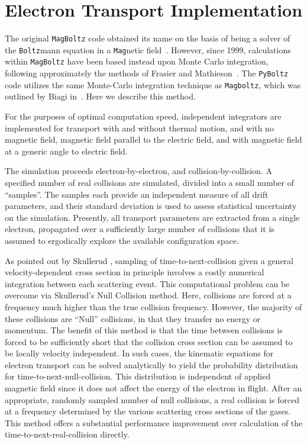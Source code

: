 \documentclass[3p,11pt]{elsarticle}
\begin{document}
\section{Electron Transport Implementation}
\label{Theory}
The original {\tt MagBoltz} code obtained its name on the basis of being a solver of the {\tt Boltz}mann equation in a {\tt Mag}netic field~\cite{biagi1988accurate,biagi1989multiterm}. However, since 1999, calculations within {\tt MagBoltz}  have been based instead upon Monte Carlo integration, following approximately the methods of Frasier and Mathieson~\cite{fraser1986monte}. The {\tt PyBoltz} code utilizes the same Monte-Carlo integration technique as {\tt Magboltz}, which was outlined by Biagi in~\cite{biagi1999monte}.  Here we describe this  method.

For the purposes of optimal computation speed, independent integrators are implemented for transport with and without thermal motion, and with no magnetic field, magnetic field parallel to the electric field, and with magnetic field at a generic angle to electric field.   

The simulation proceeds electron-by-electron, and collision-by-collision.  A specified number of real collisions are simulated, divided into a small number of ``samples''. The samples each provide an independent measure of all drift parameters, and their standard deviation is used to assess statistical uncertainty on the simulation.  Presently, all transport parameters are extracted from a single electron, propagated over a sufficiently large number of collisions that it is assumed to ergodically explore the available configuration space.

As pointed out by Skullerud \cite{skullerud1968stochastic}, sampling of time-to-next-collision given a general velocity-dependent cross section in principle involves a costly numerical integration between each scattering event.  This computational problem can be overcome via Skullerud's Null Collision method.  Here, collisions are forced at a frequency much higher than the true collision frequency. However, the majority of these collisions are ``Null'' collisions, in that they transfer no energy or momentum. The benefit of this method is that the time between collisions is forced to be sufficiently short that the collision cross section can be assumed to be locally velocity independent. In such cases, the kinematic equations for electron transport can be solved analytically to yield the probability distribution for time-to-next-null-collision.  This distribution is independent of applied magnetic field since it does not affect the energy of the electron in flight.  After an appropriate, randomly sampled number of null collisions,  a real collision is forced at a frequency determined by the various scattering cross sections of the gases.  This method offers a substantial performance improvement over calculation of the time-to-next-real-collision directly.
\end{document}
